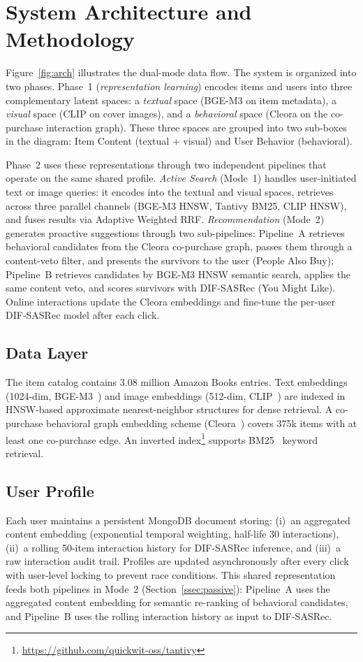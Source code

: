 \section{System Architecture and Methodology}
\label{sec:overview}

Figure~\ref{fig:arch} illustrates the dual-mode data flow.
The system is organized into two phases.
Phase~1 (\emph{representation learning})
encodes items and users into three complementary latent spaces:
a \emph{textual} space (BGE-M3 on item metadata),
a \emph{visual} space (CLIP on cover images), and
a \emph{behavioral} space (Cleora on the co-purchase interaction graph).
These three spaces are grouped into two sub-boxes in the diagram:
Item Content (textual + visual) and User Behavior (behavioral).

Phase~2 uses these representations through two
independent pipelines that operate on the same shared profile.
\emph{Active Search} (Mode~1) handles user-initiated text or
image queries: it encodes into the textual and visual spaces,
retrieves across three parallel channels
(BGE-M3 HNSW, Tantivy BM25, CLIP HNSW), and fuses results via
Adaptive Weighted RRF.
\emph{Recommendation} (Mode~2) generates proactive suggestions
through two sub-pipelines:
Pipeline~A retrieves behavioral candidates from the Cleora
co-purchase graph, passes them through a content-veto filter,
and presents the survivors to the user (People Also Buy);
Pipeline~B retrieves candidates by BGE-M3 HNSW semantic search,
applies the same content veto, and scores survivors with
DIF-SASRec (You Might Like).
Online interactions update the Cleora
embeddings and fine-tune the per-user DIF-SASRec model after each click.



\subsection{Data Layer}
The item catalog contains 3.08 million Amazon Books entries.
Text embeddings (1024-dim, BGE-M3~\cite{chen2024bgem3}) and image embeddings (512-dim, CLIP~\cite{radford2021clip}) are
indexed in HNSW-based approximate nearest-neighbor structures for dense retrieval.
A co-purchase behavioral graph embedding scheme (Cleora~\cite{cleora2021}) covers 375k items
with at least one co-purchase edge.
An inverted index\footnote{\url{https://github.com/quickwit-oss/tantivy}} supports BM25~\cite{robertson1994okapi} keyword retrieval.

\subsection{User Profile}
Each user maintains a persistent MongoDB document storing:
(i)~an aggregated content embedding (exponential temporal weighting,
half-life 30 interactions),
(ii)~a rolling 50-item interaction history for DIF-SASRec inference, and
(iii)~a raw interaction audit trail.
Profiles are updated asynchronously after every click with user-level locking
to prevent race conditions.
This shared representation feeds both pipelines in Mode~2
(Section~\ref{ssec:passive}): Pipeline~A uses the aggregated content embedding
for semantic re-ranking of behavioral candidates, and Pipeline~B uses the
rolling interaction history as input to DIF-SASRec.
